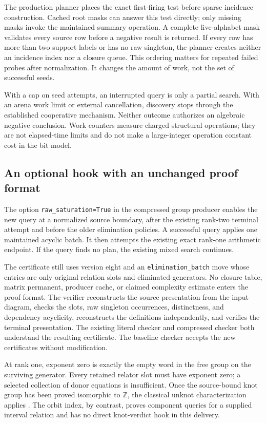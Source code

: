 The production planner places the exact first-firing test before sparse
incidence construction. Cached root masks can answer this test directly;
only missing masks invoke the maintained summary operation. A complete
live-alphabet mask validates every source row before a negative result is
returned. If every row has more than two support labels or has no raw
singleton, the planner creates neither an incidence index nor a closure
queue. This ordering matters for repeated failed probes after
normalization. It changes the amount of work, not the set of successful
seeds.

With a cap on seed attempts, an interrupted query is only a partial search.
With an arena work limit or external cancellation, discovery stops through
the established cooperative mechanism. Neither outcome authorizes an
algebraic negative conclusion. Work counters measure charged structural
operations; they are not elapsed-time limits and do not make a
large-integer operation constant cost in the bit model.

\subsection{An optional hook with an unchanged proof format}

The option \texttt{raw\_saturation=True} in the compressed group producer
enables the new query at a normalized source boundary, after the existing
rank-two terminal attempt and before the older elimination policies. A
successful query applies one maintained acyclic batch. It then attempts
the existing exact rank-one arithmetic endpoint. If the query finds no
plan, the existing mixed search continues.

The certificate still uses version eight and an
\texttt{elimination\_batch} move whose entries are only original relation
slots and eliminated generators. No closure table, matrix permanent,
producer cache, or claimed complexity estimate enters the proof format.
The verifier reconstructs the source presentation from the input diagram,
checks the slots, raw singleton occurrences, distinctness, and dependency
acyclicity, reconstructs the definitions independently, and verifies the
terminal presentation. The existing literal checker and compressed checker
both understand the resulting certificate. The baseline checker accepts
the new certificates without modification.

At rank one, exponent zero is exactly the empty word in the free group
on the surviving generator. Every retained relator slot must have
exponent zero; a selected collection of donor equations is insufficient.
Once the source-bound knot group has been proved isomorphic to
$\mathbb Z$, the classical unknot characterization applies
\cite{papakyriakopoulos}. The orbit index, by contrast, proves component
queries for a supplied interval relation and has no direct knot-verdict
hook in this delivery.

